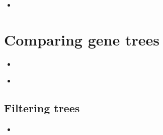 \documentclass[compress, ucs, xelatex, 11pt, xcolor=x11names, aspectratio=1609,
	hyperref={
		bookmarks=true,
		unicode=true,
		colorlinks=true,
		pdftitle={HybSeq course},
		plainpages=false,
		pdfauthor={Vojtech Zeisek},
		pdfsubject={Practical processing of HybSeq target enrichment sequencing data on computing grids like MetaCentrum},
		pdfcreator={XeLaTeX},
		pdfkeywords={BASH, command line, GNU, HybSeq, Linux, MetaCentrum, sequencing shell, target enrichment},
		linkcolor=Cyan2, %
		anchorcolor=Firebrick2, %
		citecolor=Firebrick2, %
		filecolor=Firebrick2, %
		menucolor=Firebrick2, %
		urlcolor=Chartreuse2, %
		pdftex},
	url={hyphens, lowtilde} %
	]{beamer}
\begin{document}
\begin{frame}[fragile]{}
	\begin{itemize}
		\item 
	\end{itemize}
	\begin{spluscode}
    
	\end{spluscode}
	\begin{bashcode}
    
	\end{bashcode}
\end{frame}

\section{Comparing gene trees}

\begin{frame}[fragile]{}
	\begin{itemize}
		\item 
	\end{itemize}
	\begin{spluscode}
    
	\end{spluscode}
	\begin{bashcode}
    
	\end{bashcode}
\end{frame}

\begin{frame}[fragile]{}
	\begin{itemize}
		\item 
	\end{itemize}
	\begin{spluscode}
    
	\end{spluscode}
	\begin{bashcode}
    
	\end{bashcode}
\end{frame}

\subsection{Filtering trees}

\begin{frame}[fragile]{}
	\begin{itemize}
		\item 
	\end{itemize}
	\begin{spluscode}
    
	\end{spluscode}
	\begin{bashcode}
    
	\end{bashcode}
\end{frame}
\end{document}
